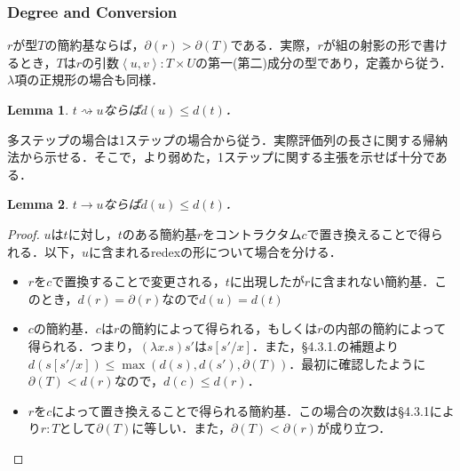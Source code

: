 \documentclass[a4paper,10pt,platex, dvipdfmx]{jsarticle}
\newtheorem{lemma}{Lemma}
\begin{document}
\subsubsection{Degree and Conversion}
$r$が型$T$の簡約基ならば，$\partial(r) > \partial(T)$である．実際，$r$が組の射影の形で書けるとき，$T$は$r$の引数$\left<u, v\right>: T\times U$の第一(第二)成分の型であり，定義から従う．$\lambda$項の正規形の場合も同様．

\begin{lemma}
$t\rightsquigarrow u$ならば$d(u)\leq d(t)$．
\end{lemma}
多ステップの場合は1ステップの場合から従う．実際評価列の長さに関する帰納法から示せる．そこで，より弱めた，1ステップに関する主張を示せば十分である．
\begin{lemma}
$t\rightarrow u$ならば$d(u)\leq d(t)$．
\end{lemma}
\begin{proof}
$u$は$t$に対し，$t$のある簡約基$r$をコントラクタム$c$で置き換えることで得られる．以下，$u$に含まれるredexの形について場合を分ける．\begin{itemize}
\item $r$を$c$で置換することで変更される，$t$に出現したが$r$に含まれない簡約基．このとき，$d(r) = \partial(r)$なので$d(u) = d(t)$
\item $c$の簡約基．$c$は$r$の簡約によって得られる，もしくは$r$の内部の簡約によって得られる．つまり，$(\lambda x. s)s'$は$s\left[s'/x\right]$．また，\S4.3.1.の補題より$d(s\left[s'/x\right])\leq \max(d(s), d(s'), \partial(T))$．最初に確認したように$\partial(T) < d(r)$なので，$d(c) \leq d(r)$．
\item $r$を$c$によって置き換えることで得られる簡約基．この場合の次数は\S4.3.1により$r :T$として$\partial(T)$に等しい．また，$\partial(T) < \partial(r)$が成り立つ．
\end{itemize}
\end{proof}
\end{document}
